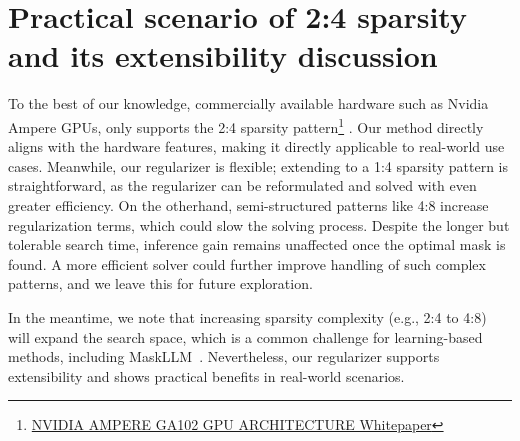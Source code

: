 \section{Practical scenario of 2:4 sparsity and its extensibility discussion}
\label{Discussion}
To the best of our knowledge, commercially available hardware such as Nvidia Ampere GPUs, only supports the 2:4 sparsity pattern\footnote{\href{https://www.nvidia.com/content/PDF/nvidia-ampere-ga-102-gpu-architecture-whitepaper-v2.pdf}{NVIDIA AMPERE GA102 GPU ARCHITECTURE Whitepaper}}
. Our method directly aligns with the hardware features, making it directly applicable to real-world use cases. Meanwhile, our regularizer is flexible; extending to a 1:4 sparsity pattern is straightforward, as the regularizer can be reformulated and solved with even greater efficiency. On the otherhand, semi-structured patterns like 4:8 increase regularization terms,
which could slow the solving process. Despite the longer but tolerable search time, 
inference gain remains unaffected once the optimal mask is found. A more efficient solver could further improve handling of such complex patterns, and we leave this for future exploration.

In the meantime, we note that increasing sparsity complexity (e.g., 2:4 to 4:8) will expand the search space, which is a common challenge for learning-based methods, including MaskLLM~\cite{fang2024maskllm}. Nevertheless, our regularizer supports extensibility and shows practical benefits in real-world scenarios.
\vspace{-0.5em}

